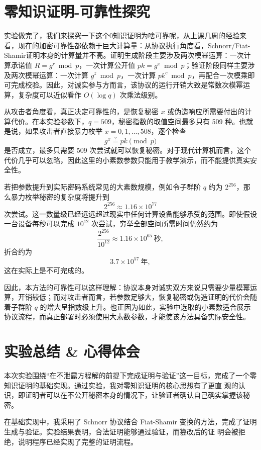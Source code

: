 \documentclass[a4paper]{article}
\begin{document}
\section{零知识证明-可靠性探究}
实验做完了，我们来探究一下这个0知识证明为啥可靠呢，从上课几周的经验来看，现在的加密可靠性都依赖于巨大计算量：从协议执行角度看，Schnorr/Fiat-Shamir证明本身的计算量并不高。证明生成阶段主要涉及两次模幂运算：一次计算承诺值 $R=g^r \bmod p$，一次计算公开值 $pk=g^x \bmod p$；验证阶段同样主要涉及两次模幂运算：一次计算 $g^z \bmod p$，一次计算 $pk^c \bmod p$，再配合一次模乘即可完成校验。因此，对诚实参与方而言，该协议的运行开销大致是常数次模幂运算，复杂度可以近似看作 $O(\log q)$ 次乘法级别。

从攻击者角度看，真正决定可靠性的，是恢复秘密 $x$ 或伪造响应所需要付出的计算代价。在本实验参数下，$q=509$，秘密指数的取值空间最多只有 509 种。也就是说，如果攻击者直接暴力枚举 $x=0,1,\dots,508$，逐个检查
\[
g^x \stackrel{?}{=} pk \pmod p
\]
是否成立，最多只需要 509 次尝试就可以恢复秘密。对于现代计算机而言，这个代价几乎可以忽略，因此这里的小素数参数只能用于教学演示，而不能提供真实安全性。

若把参数提升到实际密码系统常见的大素数规模，例如令子群阶 $q$ 约为 $2^{256}$，那么暴力枚举秘密的复杂度将提升到
\[
2^{256}\approx 1.16\times 10^{77}
\]
次尝试。这一数量级已经远远超过现实中任何计算设备能够承受的范围。即使假设一台设备每秒可以完成 $10^{12}$ 次尝试，穷举全部空间所需时间仍然约为
\[
\frac{2^{256}}{10^{12}} \approx 1.16\times 10^{65}\ \text{秒},
\]
折合约为
\[
3.7\times 10^{57}\ \text{年},
\]
这在实际上是不可完成的。

因此，本方法的可靠性可以这样理解：协议本身对诚实双方来说只需要少量模幂运算，开销较低；而对攻击者而言，若参数足够大，恢复秘密或伪造证明的代价会随着子群阶 $q$ 的增大呈指数级上升。也正因为如此，实验中选取的小素数适合展示协议流程，而真正部署时必须使用大素数参数，才能使该方法具备实际安全性。

\section{实验总结 \& 心得体会}
  本次实验围绕“在不泄露方程解的前提下完成证明与验证”这一目标，完成了一个零知识证明的基础实现。通过实验，我对零知识证明的核心思想有了更直
  观的认识，即证明者可以在不公开秘密本身的情况下，让验证者确认自己确实掌握该秘密。

  在基础实现中，我采用了 Schnorr 协议结合 Fiat-Shamir 变换的方法，完成了证明生成与验证。实验结果表明，合法证明能够通过验证，而篡改后的证
  明会被拒绝，说明程序已经实现了完整的证明流程。
\end{document}
